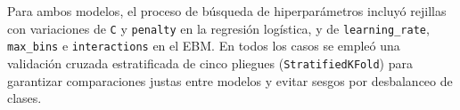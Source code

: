 Para ambos modelos, el proceso de búsqueda de hiperparámetros incluyó rejillas con variaciones de \texttt{C} y \texttt{penalty} en la regresión logística, y de \texttt{learning\_rate}, \texttt{max\_bins} e \texttt{interactions} en el EBM. En todos los casos se empleó una validación cruzada estratificada de cinco pliegues (\texttt{StratifiedKFold}) para garantizar comparaciones justas entre modelos y evitar sesgos por desbalanceo de clases.
